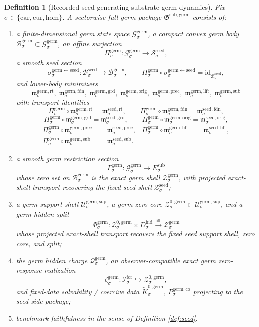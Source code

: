 \documentclass[11pt]{article}
\newcommand{\Car}{\mathrm{car}}
\newcommand{\Cur}{\mathrm{cur}}
\newcommand{\Hom}{\mathrm{hom}}
\newcommand{\ForSpace}[1]{\mathcal I_{#1}^{\mathrm{for}}}
\newcommand{\HiddenBody}[1]{D_{#1}^{\mathrm{hid}}}
\newcommand{\SeedState}[1]{\mathcal S_{#1}^{\mathrm{seed}}}
\newcommand{\SeedBody}[1]{\mathcal B_{#1}^{\mathrm{seed}}}
\newcommand{\SeedShell}[1]{\mathcal Z_{#1}^{\mathrm{seed}}}
\newcommand{\SeedRootMin}[1]{\mathfrak m_{#1}^{\mathrm{seed,rt}}}
\newcommand{\SeedFoundMin}[1]{\mathfrak m_{#1}^{\mathrm{seed,fdn}}}
\newcommand{\SeedGroundMin}[1]{\mathfrak m_{#1}^{\mathrm{seed,grd}}}
\newcommand{\SeedOrigMin}[1]{\mathfrak m_{#1}^{\mathrm{seed,orig}}}
\newcommand{\SeedPrecMin}[1]{\mathfrak m_{#1}^{\mathrm{seed,prec}}}
\newcommand{\SeedLiftMin}[1]{\mathfrak m_{#1}^{\mathrm{seed,lift}}}
\newcommand{\SeedSubMin}[1]{\mathfrak m_{#1}^{\mathrm{seed,sub}}}
\newcommand{\GermPackage}{\mathfrak G^{\mathrm{sub,germ}}}
\newcommand{\GermState}[1]{\mathcal G_{#1}^{\mathrm{germ}}}
\newcommand{\GermBody}[1]{\mathcal B_{#1}^{\mathrm{germ}}}
\newcommand{\GermProj}[1]{\Pi_{#1}^{\mathrm{germ}}}
\newcommand{\GermSeedSec}[1]{\sigma_{#1}^{\mathrm{germ\leftarrow seed}}}
\newcommand{\GermShell}[1]{\mathcal Z_{#1}^{\mathrm{germ}}}
\newcommand{\GermSupportShell}[1]{\mathcal U_{#1}^{\mathrm{germ,sup}}}
\newcommand{\GermZeroCore}[1]{\mathcal Z_{#1}^{0,\mathrm{germ}}}
\newcommand{\GermSplit}[1]{\Phi_{#1}^{\mathrm{germ}}}
\newcommand{\GermRootMin}[1]{\mathfrak m_{#1}^{\mathrm{germ,rt}}}
\newcommand{\GermFoundMin}[1]{\mathfrak m_{#1}^{\mathrm{germ,fdn}}}
\newcommand{\GermGroundMin}[1]{\mathfrak m_{#1}^{\mathrm{germ,grd}}}
\newcommand{\GermOrigMin}[1]{\mathfrak m_{#1}^{\mathrm{germ,orig}}}
\newcommand{\GermPrecMin}[1]{\mathfrak m_{#1}^{\mathrm{germ,prec}}}
\newcommand{\GermLiftMin}[1]{\mathfrak m_{#1}^{\mathrm{germ,lift}}}
\newcommand{\GermSubMin}[1]{\mathfrak m_{#1}^{\mathrm{germ,sub}}}
\newcommand{\GermSection}[1]{\Gamma_{#1}^{\mathrm{germ}}}
\newcommand{\GermCharge}[1]{\mathcal Q_{#1}^{\mathrm{germ}}}
\newcommand{\GermEmbed}[1]{\zeta_{#1}^{\mathrm{germ}}}
\newcommand{\GermKernel}[1]{\widetilde K_{#1}^{0,\mathrm{germ}}}
\newcommand{\GermCoercive}[1]{P_{#1}^{\mathrm{germ,co}}}
\newtheorem{definition}{Definition}
\begin{document}
\begin{definition}[Recorded seed-generating substrate germ dynamics]
\label{def:germ}
Fix \(\sigma\in\{\Car,\Cur,\Hom\}\). A sectorwise full germ package \(\GermPackage\) consists of:
\begin{enumerate}
    \item a finite-dimensional germ state space \(\GermState{\sigma}\), a compact convex germ body \(\GermBody{\sigma}\subset\GermState{\sigma}\), an affine surjection
    \[
    \GermProj{\sigma}:\GermState{\sigma}\to\SeedState{\sigma},
    \]
    a smooth seed section
    \[
    \GermSeedSec{\sigma}:\SeedBody{\sigma}\to\GermBody{\sigma},
    \qquad
    \GermProj{\sigma}\circ\GermSeedSec{\sigma}
    =
    \mathrm{id}_{\SeedBody{\sigma}},
    \]
    and lower-body minimizers
    \[
    \GermRootMin{\sigma},\;
    \GermFoundMin{\sigma},\;
    \GermGroundMin{\sigma},\;
    \GermOrigMin{\sigma},\;
    \GermPrecMin{\sigma},\;
    \GermLiftMin{\sigma},\;
    \GermSubMin{\sigma}
    \]
    with transport identities
    \[
    \GermProj{\sigma}\circ\GermRootMin{\sigma}
    =
    \SeedRootMin{\sigma},
    \qquad
    \GermProj{\sigma}\circ\GermFoundMin{\sigma}
    =
    \SeedFoundMin{\sigma},
    \]
    \[
    \GermProj{\sigma}\circ\GermGroundMin{\sigma}
    =
    \SeedGroundMin{\sigma},
    \qquad
    \GermProj{\sigma}\circ\GermOrigMin{\sigma}
    =
    \SeedOrigMin{\sigma},
    \]
    \begin{align*}
    \GermProj{\sigma}\circ\GermPrecMin{\sigma}
    &=
    \SeedPrecMin{\sigma},
    &
    \GermProj{\sigma}\circ\GermLiftMin{\sigma}
    &=
    \SeedLiftMin{\sigma},
    \\
    \GermProj{\sigma}\circ\GermSubMin{\sigma}
    &=
    \SeedSubMin{\sigma}.
    \end{align*}
    \item a smooth germ restriction section
    \[
    \GermSection{\sigma}:\GermState{\sigma}\to E_{\sigma}^{\mathrm{sub}}
    \]
    whose zero set on \(\GermBody{\sigma}\) is the exact germ shell \(\GermShell{\sigma}\), with projected exact-shell transport recovering the fixed seed shell \(\SeedShell{\sigma}\);
    \item a germ support shell \(\GermSupportShell{\sigma}\), a germ zero core \(\GermZeroCore{\sigma}\subset\GermSupportShell{\sigma}\), and a germ hidden split
    \[
    \GermSplit{\sigma}:
    \GermZeroCore{\sigma}\times\HiddenBody{\sigma}
    \xrightarrow{\cong}
    \GermShell{\sigma}
    \]
    whose projected exact-shell transport recovers the fixed seed support shell, zero core, and split;
    \item the germ hidden charge \(\GermCharge{\sigma}\), an observer-compatible exact germ zero-response realization
    \[
    \GermEmbed{\sigma}:\ForSpace{\sigma}\hookrightarrow\GermZeroCore{\sigma},
    \]
    and fixed-data solvability / coercive data \(\GermKernel{\sigma}\), \(\GermCoercive{\sigma}\) projecting to the seed-side package;
    \item benchmark faithfulness in the sense of Definition \ref{def:seed}.
\end{enumerate}
\end{definition}
\end{document}
